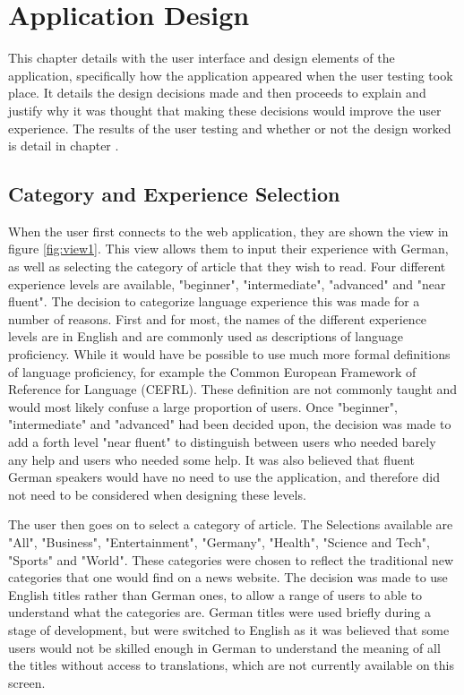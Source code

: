 \chapter{Application Design}

This chapter details with the user interface and design elements of the application, specifically how the application appeared when the user testing took place. It details  the design decisions made and then proceeds to explain and justify why it was thought that making these decisions would improve the user experience. The results of the user testing and whether or not the design worked is detail in chapter .

\section{Category and Experience Selection}

When the user first connects to the web application, they are shown the view in figure \ref{fig:view1}. This view allows them to input their experience with German, as well as selecting the category of article that they wish to read. Four different experience levels are available, "beginner", "intermediate", "advanced" and "near fluent". The decision to categorize language experience this was made for a number of reasons. First and for most, the names of the different experience levels are in English and are commonly used as descriptions of language proficiency. While it would have be possible to use much more formal definitions of language proficiency, for example the Common European Framework of Reference for Language (CEFRL). These definition are not commonly taught and would most likely confuse a large proportion of users. Once "beginner", "intermediate" and "advanced" had been decided upon, the decision was made to add a forth level "near fluent" to distinguish between users  who needed barely any help and users who needed some help. It was also believed that fluent German speakers would have no need to use the application, and therefore did not need to be considered when designing these levels.



The user then goes on to select a category of article. The Selections available are "All", "Business", "Entertainment", "Germany", "Health", "Science and Tech", "Sports" and "World". These categories were chosen to reflect the traditional new categories that one would find on a news website. The decision was made to use English titles rather than German ones, to allow a range of users to able to understand what the categories are. German titles were used briefly during a stage of development, but were switched to English as it was believed that some users would not be skilled enough in German to understand the meaning of all the titles without access to translations, which are not currently available on this screen. 

